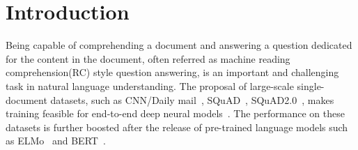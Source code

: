 \section{Introduction}
Being capable of comprehending a document and answering a 
question dedicated for the content in the document, often referred as machine reading comprehension(RC) style question answering, is an important and 
challenging task in natural language understanding. The proposal of large-scale single-document datasets, such as CNN/Daily mail~\cite{DBLP:journals/corr/HermannKGEKSB15}, SQuAD~\cite{DBLP:journals/corr/RajpurkarZLL16}, SQuAD2.0~\cite{DBLP:journals/corr/abs-1806-03822}, makes 
training feasible for end-to-end deep neural models~\cite{DBLP:journals/corr/SeoKFH16, DBLP:journals/corr/XiongZS16,Shen2017}. 
The performance on these datasets is further boosted after the release of pre-trained language models such as ELMo~\cite{DBLP:journals/corr/abs-1802-05365} and BERT~\cite{DBLP:journals/corr/abs-1810-04805}. 

